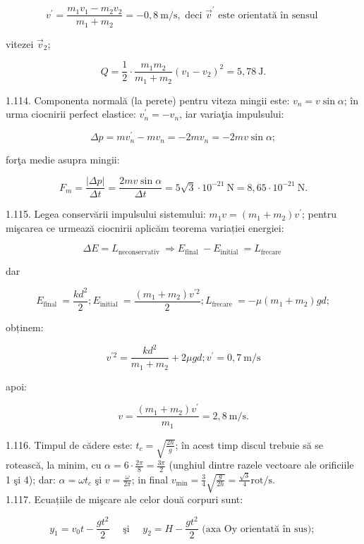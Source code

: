 \documentclass[10pt]{article}
\begin{document}
$$
v^{\prime}=\frac{m_{1} v_{1}-m_{2} v_{2}}{m_{1}+m_{2}}=-0,8 \mathrm{~m} / \mathrm{s}, \text { deci } \vec{v}^{\prime} \text { este orientată în sensul }
$$

vitezei $\vec{v}_{2}$;

$$
Q=\frac{1}{2} \cdot \frac{m_{1} m_{2}}{m_{1}+m_{2}}\left(v_{1}-v_{2}\right)^{2}=5,78 \mathrm{~J} .
$$

1.114. Componenta normală (la perete) pentru viteza mingii este: $v_{n}=v \sin \alpha$; în urma ciocnirii perfect elastice: $v_{n}^{\prime}=-v_{n}$, iar variaţia impulsului:

$$
\Delta p=m v_{n}^{\prime}-m v_{n}=-2 m v_{n}=-2 m v \sin \alpha ;
$$

forţa medie asupra mingii:

$$
F_{m}=\frac{|\Delta p|}{\Delta t}=\frac{2 m v \sin \alpha}{\Delta t}=5 \sqrt{3} \cdot 10^{-21} \mathrm{~N}=8,65 \cdot 10^{-21} \mathrm{~N} .
$$

1.115. Legea conservării impulsului sistemului: $m_{1} v=\left(m_{1}+m_{2}\right) v^{\prime}$; pentru mişcarea ce urmează ciocnirii aplicăm teorema variației energiei:

$$
\Delta E=L_{\text {neconservativ }} \Rightarrow E_{\text {final }}-E_{\text {initial }}=L_{\text {frecare }}
$$

dar

$$
E_{\text {final }}=\frac{k d^{2}}{2} ; E_{\text {initial }}=\frac{\left(m_{1}+m_{2}\right) v^{\prime 2}}{2} ; L_{\text {frecare }}=-\mu\left(m_{1}+m_{2}\right) g d ;
$$

obținem:

$$
v^{\prime 2}=\frac{k d^{2}}{m_{1}+m_{2}}+2 \mu g d ; v^{\prime}=0,7 \mathrm{~m} / \mathrm{s}
$$

apoi:

$$
v=\frac{\left(m_{1}+m_{2}\right) v^{\prime}}{m_{1}}=2,8 \mathrm{~m} / \mathrm{s} .
$$

1.116. Timpul de cădere este: $t_{c}=\sqrt{\frac{2 h}{g}}$; în acest timp discul trebuie să se rotească, la minim, cu $\alpha=6 \cdot \frac{2 \pi}{8}=\frac{3 \pi}{2}$ (unghiul dintre razele vectoare ale orificiile 1 şi 4); dar: $\alpha=\omega t_{c}$ şi $v=\frac{\omega}{2 \pi}$; in final $v_{\min }=\frac{3}{4} \sqrt{\frac{g}{2 h}}=\frac{\sqrt{3}}{4} \mathrm{rot} / \mathrm{s}$.\\
1.117. Ecuațiile de mişcare ale celor două corpuri sunt:

$$
y_{1}=v_{0} t-\frac{g t^{2}}{2} \quad \text { şi } \quad y_{2}=H-\frac{g t^{2}}{2} \text { (axa Oy orientată în sus); }
$$
\end{document}
